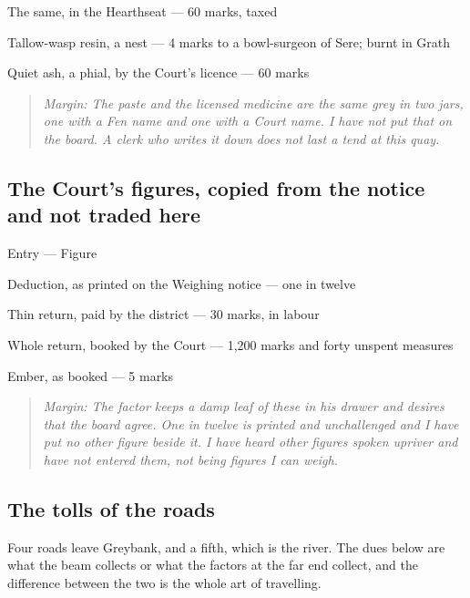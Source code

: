 \documentclass{design/chronicle}
\begin{document}
The same, in the Hearthseat — 60 marks, taxed\par

Tallow-wasp resin, a nest — 4 marks to a bowl-surgeon of Sere; burnt in Grath\par

Quiet ash, a phial, by the Court’s licence — 60 marks\par

\begin{quote}\itshape \emph{Margin:} The paste and the licensed medicine are the same grey in two jars, one with a Fen name and one with a Court name. I have not put that on the board. A clerk who writes it down does not last a tend at this quay.\end{quote}

\subsection*{The Court’s figures, copied from the notice and not traded here}

Entry — Figure\par

Deduction, as printed on the Weighing notice — one in twelve\par

Thin return, paid by the district — 30 marks, in labour\par

Whole return, booked by the Court — 1,200 marks and forty unspent measures\par

Ember, as booked — 5 marks\par

\begin{quote}\itshape \emph{Margin:} The factor keeps a damp leaf of these in his drawer and desires that the board agree. One in twelve is printed and unchallenged and I have put no other figure beside it. I have heard other figures spoken upriver and have not entered them, not being figures I can weigh.\end{quote}

\subsection*{The tolls of the roads}

Four roads leave Greybank, and a fifth, which is the river. The dues below are what the beam collects or what the factors at the far end collect, and the difference between the two is the whole art of travelling.
\end{document}
